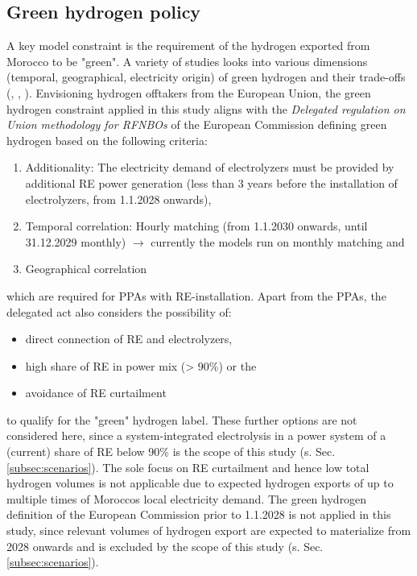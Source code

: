 \subsection{Green hydrogen policy}
\label{subsubsec:green_hydrogen_constraint}

A key model constraint is the requirement of the hydrogen exported from Morocco to be "green". A variety of studies looks into various dimensions (temporal, geographical, electricity origin) of green hydrogen and their trade-offs (\cite{Brauer2022}, \cite{Ruhnau2022}, \cite{Zeyen2022}). Envisioning hydrogen offtakers from the European Union, the green hydrogen constraint applied in this study aligns with the \emph{Delegated regulation on Union methodology for RFNBOs} of the European Commission \cite{Commission2023} defining green hydrogen  based on the following criteria:

\begin{enumerate}
    \item Additionality: The electricity demand of electrolyzers must be provided by additional RE power generation (less than 3 years before the installation of electrolyzers, from 1.1.2028 onwards),
    \item Temporal correlation: Hourly matching (from 1.1.2030 onwards, until 31.12.2029 monthly) $\rightarrow$ currently the models run on monthly matching and
    \item Geographical correlation
\end{enumerate}
which are required for PPAs with RE-installation. Apart from the PPAs, the delegated act also considers the possibility of:
\begin{itemize}
    \item direct connection of RE and electrolyzers,
    \item high share of RE in power mix (> 90\%) or the
    \item avoidance of RE curtailment
\end{itemize}
to qualify for the "green" hydrogen label. These further options are not considered here, since a system-integrated electrolysis in a power system of a (current) share of RE below 90\% is the scope of this study (s. Sec. \ref{subsec:scenarios}). The sole focus on RE curtailment and hence low total hydrogen volumes is not applicable due to expected hydrogen exports of up to multiple times of Moroccos local electricity demand. The green hydrogen definition of the European Commission prior to 1.1.2028 is not applied in this study, since relevant volumes of hydrogen export are expected to materialize from 2028 onwards and is excluded by the scope of this study (s. Sec. \ref{subsec:scenarios}).


